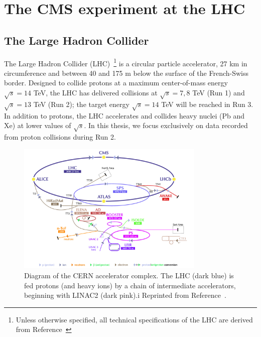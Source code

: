 \chapter{The CMS experiment at the LHC}
\label{sec:cms}

\section{The Large Hadron Collider}

The Large Hadron Collider (LHC)~\cite{lhcjinst}\footnote{Unless otherwise specified, all technical specifications of the LHC are derived from Reference~\cite{lhcjinst}} is a circular particle accelerator, 27 km in circumference and between 40 and 175 m below the surface of the French-Swiss border. 
Designed to collide protons at a maximum center-of-mass energy $\sqrt{s} = 14$ TeV, the LHC has delivered collisions at $\sqrt{s}=7,8$ TeV (Run 1) and $\sqrt{s} = 13$ TeV (Run 2); the target energy $\sqrt{s} = 14$ TeV will be reached in Run 3. 
In addition to protons, the LHC accelerates and collides heavy nuclei (Pb and Xe) at lower values of $\sqrt{s}$. 
In this thesis, we focus exclusively on data recorded from proton collisions during Run 2. 

\begin{figure}[][]
    \begin{center}
        \includegraphics[width=0.8\textwidth]{figures/cms/lhc.png}
        \caption{Diagram of the CERN accelerator complex.
                 The LHC (dark blue) is fed protons (and heavy ions) by a chain of intermediate accelerators, beginning with LINAC2 (dark pink).i
                 Reprinted from Reference~\cite{lhcpic}. 
                    }
        \label{fig:cms:lhc}
    \end{center}
\end{figure}

